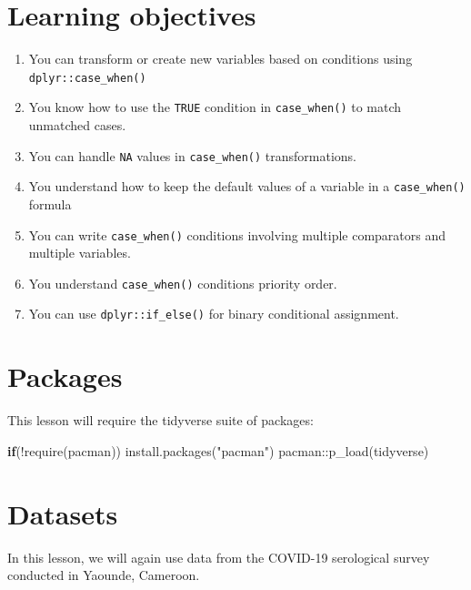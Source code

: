 \documentclass[
  letterpaper,
  DIV=11,
  numbers=noendperiod]{scrreprt}
\newenvironment{Shaded}{\begin{snugshade}}{\end{snugshade}}
\newcommand{\ControlFlowTok}[1]{\textcolor[rgb]{0.00,0.23,0.31}{\textbf{#1}}}
\newcommand{\FunctionTok}[1]{\textcolor[rgb]{0.28,0.35,0.67}{#1}}
\newcommand{\NormalTok}[1]{\textcolor[rgb]{0.00,0.23,0.31}{#1}}
\newcommand{\SpecialCharTok}[1]{\textcolor[rgb]{0.37,0.37,0.37}{#1}}
\newcommand{\StringTok}[1]{\textcolor[rgb]{0.13,0.47,0.30}{#1}}
\begin{document}
\section{Learning objectives}\label{learning-objectives-9}

\begin{enumerate}
\def\labelenumi{\arabic{enumi}.}
\item
  You can transform or create new variables based on conditions using
  \texttt{dplyr::case\_when()}
\item
  You know how to use the \texttt{TRUE} condition in
  \texttt{case\_when()} to match unmatched cases.
\item
  You can handle \texttt{NA} values in \texttt{case\_when()}
  transformations.
\item
  You understand how to keep the default values of a variable in a
  \texttt{case\_when()} formula
\item
  You can write \texttt{case\_when()} conditions involving multiple
  comparators and multiple variables.
\item
  You understand \texttt{case\_when()} conditions priority order.
\item
  You can use \texttt{dplyr::if\_else()} for binary conditional
  assignment.
\end{enumerate}

\section{Packages}\label{packages-5}

This lesson will require the tidyverse suite of packages:

\begin{Shaded}
\begin{Highlighting}[]
\ControlFlowTok{if}\NormalTok{(}\SpecialCharTok{!}\FunctionTok{require}\NormalTok{(pacman)) }\FunctionTok{install.packages}\NormalTok{(}\StringTok{"pacman"}\NormalTok{)}
\NormalTok{pacman}\SpecialCharTok{::}\FunctionTok{p\_load}\NormalTok{(tidyverse)}
\end{Highlighting}
\end{Shaded}

\section{Datasets}\label{datasets-1}

In this lesson, we will again use data from the COVID-19 serological
survey conducted in Yaounde, Cameroon.
\end{document}
